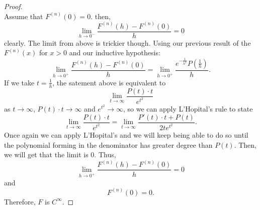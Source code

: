 \documentclass{article}
\begin{document}
\begin{proof}
\[  \]
  Assume that $F^{(n)}(0) = 0$. then, 
  \[
    \lim\limits_{h \to 0^-}\frac{F^{(n)}(h) - F^{(n)}(0)}{h} = 0
  \]
  clearly. The limit from above is trickier though. Using our previous result of the $F^{(n)}(x)$ for $x > 0$ and our inductive hypothesis:
  \[
    \lim\limits_{h \to 0^+}\frac{F^{(n)}(h) - F^{(n)}(0)}{h} = \lim\limits_{h \to 0^+}\frac{e^{-\frac{1}{h^2}}P\left(\frac{1}{h}\right)}{h}.
    \]
    If we take $t = \frac{1}{h}$, the satement above is equivalent to 
    \[
    \lim\limits_{t \to \infty} \frac{P(t)\cdot t}{e^{t^2}}  
    \]
    as $t \to \infty$, $P(t)\cdot t \to \infty$ and $e^{t^2} \to \infty$, so we can apply L'Hopital's rule to state
    \[
    \lim\limits_{t \to \infty}\frac{P(t)\cdot t}{e^{t^2}}  = \lim\limits_{t \to \infty}\frac{P'(t)\cdot t + P(t)}{2te^{t^2}}. 
    \]
    Once again we can apply L'Hopital's and we will keep being able to do so until the polynomial forming in the denominator has greater degree than $P(t)$. Then, we will get that the limit is $0$. Thus, 
    \[
    \lim\limits_{h \to 0^+} \frac{F^{(n)}(h) - F^{(n)}(0)}{h} = 0 
    \]
    and 
    \[
    F^{(n)}(0) = 0.   
    \]
    Therefore, $F$ is $C^{\infty}$. 
\end{proof}
\end{document}
